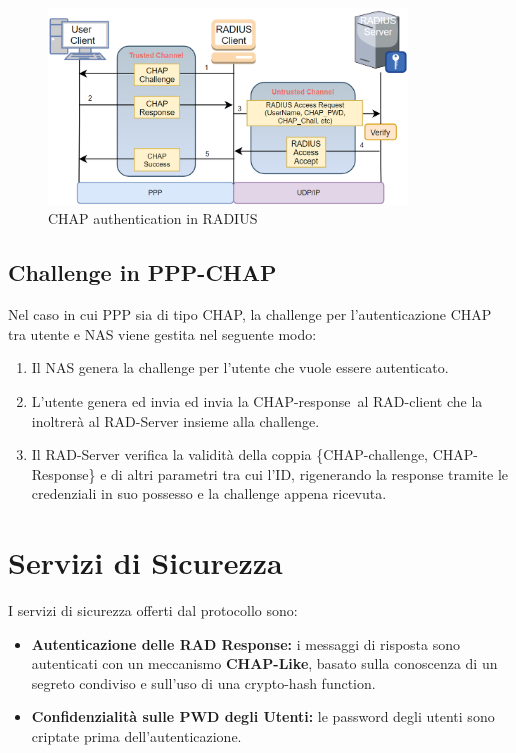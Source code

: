 \begin{figure}[ht]
    \centering
    \includegraphics[width=0.85\textwidth]{image/chaprad.png}
    \caption{CHAP authentication in RADIUS}
    \label{fig:chaprad}
\end{figure}
\subsection{Challenge in PPP-CHAP}
Nel caso in cui PPP sia di tipo CHAP, la challenge per l'autenticazione CHAP tra utente e NAS viene gestita nel seguente modo:
\begin{definition}\label{def:chapradius}
\begin{enumerate}
    \item Il NAS genera la challenge per l'utente che vuole essere autenticato.
    \item L'utente genera ed invia ed invia la CHAP-response\footnotemark\, al RAD-client che la inoltrerà al RAD-Server insieme alla challenge.
    \item Il RAD-Server verifica la validità della coppia \{CHAP-challenge, CHAP-Response\} e di altri parametri tra cui l'ID, rigenerando la response tramite le credenziali in suo possesso e la challenge appena ricevuta.
\end{enumerate}
\end{definition}
\section{Servizi di Sicurezza}
I servizi di sicurezza offerti dal protocollo sono: 
\begin{theorem}
 \begin{itemize}
     \item \textbf{Autenticazione delle RAD Response:} i messaggi di risposta sono autenticati con un meccanismo \textbf{CHAP-Like}\footnotemark, basato sulla conoscenza di un segreto condiviso e sull'uso di una crypto-hash function.
     \item \textbf{Confidenzialità sulle PWD degli Utenti:} le password degli utenti sono criptate prima dell'autenticazione.
 \end{itemize}
\end{theorem}
